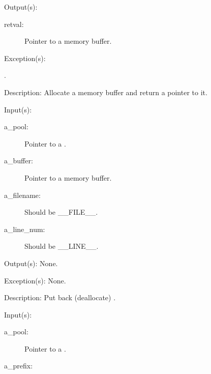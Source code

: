 \begin{capi}
\begin{capilist}
\begin{description}
		\end{description}
	\item[Output(s): ]
		\begin{description}\item[]
		\item[retval: ]
			Pointer to a memory buffer.
		\end{description}
	\item[Exception(s): ]
		\begin{description}\item[]
		\item[.]
		\end{description}
	\item[Description: ]
		Allocate a memory buffer and return a pointer to it.
	\end{capilist}
\label{pool_put_e}
\label{pool_put}
	\begin{capilist}
	\item[Input(s): ]
		\begin{description}\item[]
		\item[a\_pool: ]
			Pointer to a .
		\item[a\_buffer: ]
			Pointer to a memory buffer.
		\item[a\_filename: ]
			Should be \_\_FILE\_\_.
		\item[a\_line\_num: ]
			Should be \_\_LINE\_\_.
		\end{description}
	\item[Output(s): ] None.
	\item[Exception(s): ] None.
	\item[Description: ]
		Put back (deallocate) .
	\end{capilist}
\label{pool_dump}
	\begin{capilist}
	\item[Input(s): ]
		\begin{description}\item[]
		\item[a\_pool: ]
			Pointer to a \classname{pool}.
		\item[a\_prefix: ]

\end{description}
\end{capilist}
\end{capi}
